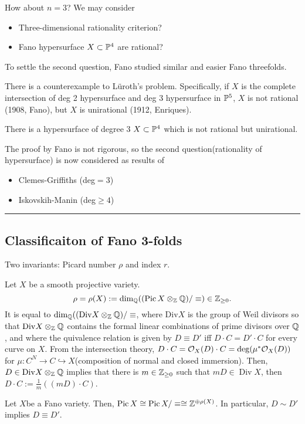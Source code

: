 \documentclass{../../small}
\DeclareMathOperator{\Pic}{Pic}
\DeclareMathOperator{\Div}{Div}
\begin{document}
How about $n=3$?
We may consider
\begin{itemize}
\item Three-dimensional rationality criterion?
\item Fano hypersurface $X\subset\P^4$ are rational?
\end{itemize}
To settle the second question, Fano studied similar and easier Fano threefolds.
\begin{thm}
There is a counterexample to L\"uroth's problem.
Specifically, if $X$ is the complete intersection of deg 2 hypersurface and deg 3 hypersurface in $\P^5$, $X$ is not rational (1908, Fano), but $X$ is unirational (1912, Enriques).
\end{thm}
\begin{thm}[1942, G. Fano]
There is a hypersurface of degree 3 $X\subset\P^4$ which is not rational but unirational.
\end{thm}
\begin{rmk}
The proof by Fano is not rigorous, so the second question(rationality of hypersurface) is now considered as results of
\begin{itemize}
	\item Clemes-Griffiths (deg$=3$)
	\item Iskovskih-Manin (deg$\ge4$)
\end{itemize}
\end{rmk}

\smallskip\hrule

\subsection*{Classificaiton of Fano 3-folds}
Two invariants: Picard number $\rho$ and index $r$.
\begin{defn}
Let $X$ be a smooth projective variety.
\[\rho=\rho(X):=\dim_\Q((\Pic X\otimes_\Z\Q)/\equiv)\in\Z_{\ge0}.\]
It is equal to $\dim_\Q((\mathrm{Div}X\otimes_\Z\Q)/\equiv$, where $\mathrm{Div}X$ is the group of Weil divisors so that $\mathrm{Div}X\otimes_\Z\Q$ contains the formal linear combinations of prime divisors over $\Q$, and where the quivalence relation is given by $D\equiv D'$ iff $D\cdot C=D'\cdot C$ for every curve on $X$.
From the intersection theory, $D\cdot C=\cO_X(D)\cdot C=\deg(\mu^*\cO_X(D))$ for $\mu:C^N\to C\hookrightarrow X$(composition of normal and closed immersion).
Then, $D\in\mathrm{Div}X\otimes_\Z\Q$ implies that there is $m\in\Z_{\ge0}$ such that $mD\in\Div X$, then $D\cdot C:=\frac1m((mD)\cdot C)$.
\begin{rmk}
Let $X$be a Fano variety.
Then, $\Pic X\cong \Pic X/\equiv\cong\Z^{\oplus\rho(X)}$.
In particular, $D\sim D'$ implies $D\equiv D'$.
\end{rmk}
\end{defn}
\end{document}
